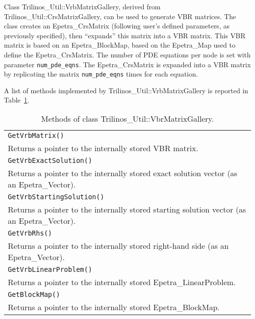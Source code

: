 \medskip

Class Trilinos\_Util::VrbMatrixGallery, derived from
Trilinos\_Util::CrsMatrixGallery, can be used to generate VBR matrices.
The class creates an Epetra\_CrsMatrix (following user's defined
parameters, as previously specified), then ``expands'' this matrix into
a VBR matrix. This VBR  matrix is based on an Epetra\_BlockMap, based on
the Epetra\_Map used to define the Epetra\_CrsMatrix. The number of PDE
equations per node is set with parameter \verb!num_pde_eqns!. The
Epetra\_CrsMatrix is expanded into a VBR matrix by replicating the
matrix \verb!num_pde_eqns! times for each equation.

A list of methods implemented by Trilinos\_Util::VrbMatrixGallery is
reported in Table~\ref{tab:triutils:vbr}.

\begin{table}[htbp]
  \centering
  \begin{tabular}{| p{14cm} |}
    \hline
    {\tt GetVrbMatrix()}\\
    {Returns a pointer to the internally
  stored VBR matrix.} \\
\tt GetVrbExactSolution() \\
{Returns a pointer to the internally
  stored exact solution vector (as an Epetra\_Vector).} \\
{\tt GetVrbStartingSolution()} \\
 {Returns a pointer to the
  internally stored starting solution vector (as an Epetra\_Vector).} \\
{\tt GetVrbRhs()}  \\
 {Returns a pointer to the internally
  stored right-hand side (as an Epetra\_Vector).} \\
{\tt GetVrbLinearProblem()} \\
 {Returns a pointer to the internally
  stored  Epetra\_LinearProblem.} \\
{\tt GetBlockMap()}\\
 {Returns a pointer to the internally
  stored Epetra\_BlockMap.} \\
    \hline
  \end{tabular}
  \caption{Methods of class Trilinos\_Util::VbrMatrixGallery.}
  \label{tab:triutils:vbr}
\end{table}

\medskip

